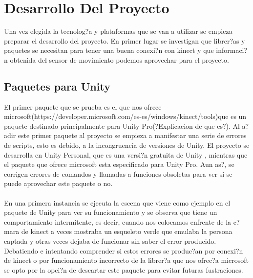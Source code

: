 
%
%

\chapter{Desarrollo Del Proyecto}


\label{cap4:sec:Desarrollo Del Proyecto}
Una vez elegida la tecnolog?a y plataformas que se van a utilizar se empieza preparar el desarrollo del proyecto. En primer lugar se investigan que librer?as y paquetes se necesitan para tener una buena conexi?n con kinect y que informaci?n obtenida del sensor de movimiento podemos aprovechar para el proyecto.

\section{Paquetes para Unity}

\label{cap4:sec:Paquetes para Unity}
El primer paquete que se prueba es el que nos ofrece microsoft(https://developer.microsoft.com/es-es/windows/kinect/tools)que es un paquete destinado principalmente para Unity Pro(?Explicacion de que es?). Al a?adir este primer paquete al proyecto se empieza a manifestar una serie de errores de scripts, esto es debido, a la incongruencia de versiones de Unity. El proyecto se desarrolla en Unity Personal, que es una versi?n gratuita de Unity , mientras que el paquete que ofrece microsoft esta especificado para Unity Pro. Aun as?, se corrigen errores de comandos y llamadas a funciones obsoletas para ver si se puede aprovechar este paquete o no.\\\\
En una primera instancia se ejecuta la escena que viene como ejemplo en el paquete de Unity para ver su funcionamiento y se observa que tiene un comportamiento intermitente, es decir, cuando nos colocamos enfrente de la c?mara de kinect a veces mostraba un esqueleto verde que emulaba la persona captada y otras veces dejaba de funcionar sin saber el error producido.
Debatiendo e intentando comprender si estos errores se produc?an por conexi?n de kinect o por funcionamiento incorrecto de la librer?a que nos ofrec?a microsoft se opto por la opci?n de descartar este paquete para evitar futuras fustraciones.\\

